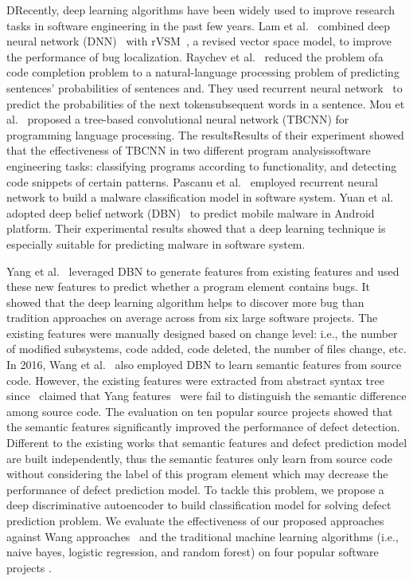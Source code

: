 DRecently, deep learning algorithms have been widely used to improve research tasks in software engineering in the past few years. Lam et al.~\cite{lam2015combining} combined deep neural network (DNN)~\cite{hecht1988theory} with rVSM~\cite{zhou2012should}, a revised vector space model, to improve the performance of bug localization. Raychev et al.~\cite{raychev2014code} reduced the problem ofa code completion problem to a natural-language processing problem of predicting sentences' probabilities of sentences and. They used recurrent neural network~\cite{mikolov2010recurrent} to predict the probabilities of the next tokensubsequent words in a sentence. Mou et al.~\cite{mou2014tbcnn} proposed a tree-based convolutional neural network (TBCNN) for programming language processing. The resultsResults of their experiment showed that the effectiveness of TBCNN  in two different program analysissoftware engineering tasks: classifying programs according to functionality, and detecting code snippets of certain patterns. Pascanu et al.~\cite{pascanu2015malware} employed recurrent neural network to build a malware classification model in software system. Yuan et al.~\cite{yuan2014droid} adopted deep belief network (DBN)~\cite{hinton2009deep} to predict mobile malware in Android platform. Their experimental results showed that a deep learning technique is especially suitable for predicting malware in software system. 

Yang et al.~\cite{yang2015deep} leveraged DBN to generate features from existing features and used these new features to predict whether a program element contains bugs. It showed that the deep learning algorithm helps to discover more bug than tradition approaches on average across from six large software projects. The existing features were manually designed based on change level: i.e., the number of modified subsystems, code added, code deleted, the number of files change, etc. In 2016, Wang et al.~\cite{wang2016automatically} also employed DBN to learn semantic features from source code. However, the existing features were extracted from abstract syntax tree since~\cite{wang2012compressed} claimed that Yang features~\cite{yang2015deep} were fail to distinguish the semantic difference among source code. The evaluation on ten popular source projects showed that the semantic features significantly improved the performance of defect detection. Different to the existing works that semantic features and defect prediction model are built independently, thus the semantic features only learn from source code without considering the label of this program element which may decrease the performance of defect prediction model. To tackle this problem, we propose a deep  discriminative autoencoder to build classification model for solving defect prediction problem.  We evaluate the effectiveness of our proposed approaches against Wang approaches~\cite{wang2012compressed} and the traditional machine learning algorithms (i.e., naive bayes, logistic regression, and random forest) on four popular software projects .

